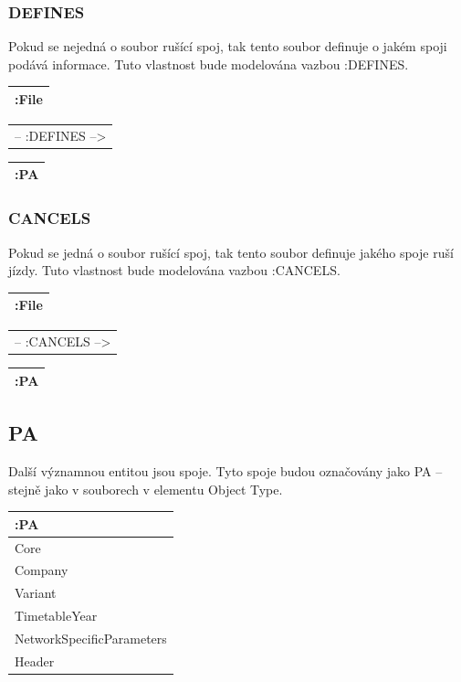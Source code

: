 \documentclass[10pt,xcolor=pdflatex,dvipsnames,table,oneside]{book}
\begin{document}
\subsubsection{DEFINES}
Pokud se nejedná o soubor rušící spoj, tak tento soubor definuje o jakém spoji podává informace. Tuto vlastnost bude modelována vazbou :DEFINES.

\vspace{1em}
\begin{tabular}{|l|}
    \hline
    :File \\
    \hline
\end{tabular}
\begin{tabular}{c}
    -- :DEFINES --> \\
\end{tabular}
\begin{tabular}{|l|}
    \hline
    :PA \\
    \hline
\end{tabular}

\subsubsection{CANCELS}
Pokud se jedná o soubor rušící spoj, tak tento soubor definuje jakého spoje ruší jízdy. Tuto vlastnost bude modelována vazbou :CANCELS.

\vspace{1em}
\begin{tabular}{|l|}
    \hline
    :File \\
    \hline
\end{tabular}
\begin{tabular}{c}
    -- :CANCELS --> \\
\end{tabular}
\begin{tabular}{|l|}
    \hline
    :PA \\
    \hline
\end{tabular}

\subsection{PA}
Další významnou entitou jsou spoje. Tyto spoje budou označovány jako PA -- stejně jako v souborech v elementu Object Type.

\vspace{1em}
\begin{tabular}{|l|}
    \hline
    :PA \\
    \hline
    Core \\
    Company \\
    Variant \\
    TimetableYear \\
    NetworkSpecificParameters \\
    Header \\
    \hline
\end{tabular}
\end{document}
